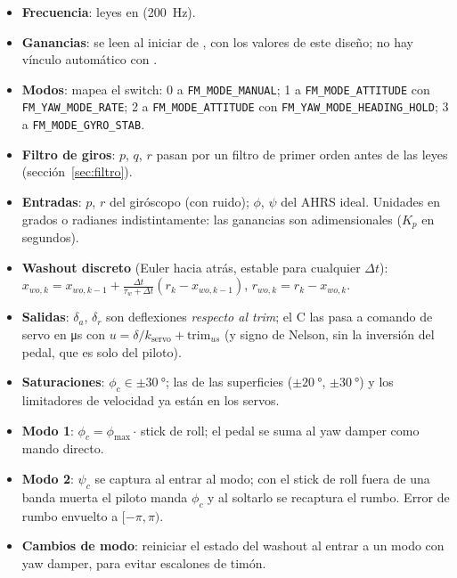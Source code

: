 \documentclass[11pt,a4paper]{article}
\begin{document}
\begin{itemize}
  \item \textbf{Frecuencia}: leyes en  (\SI{200}{Hz}).
  \item \textbf{Ganancias}: se leen al iniciar de
        , con los valores de este diseño; no hay
        vínculo automático con .
  \item \textbf{Modos}:  mapea el switch: 0 a
        \texttt{FM\_MODE\_MANUAL}; 1 a \texttt{FM\_MODE\_ATTITUDE} con
        \texttt{FM\_YAW\_MODE\_RATE}; 2 a \texttt{FM\_MODE\_ATTITUDE} con
        \texttt{FM\_YAW\_MODE\_HEADING\_HOLD}; 3 a
        \texttt{FM\_MODE\_GYRO\_STAB}.
  \item \textbf{Filtro de giros}: $p$, $q$, $r$ pasan por un filtro de primer
        orden antes de las leyes (sección~\ref{sec:filtro}).
  \item \textbf{Entradas}: $p$, $r$ del giróscopo (con ruido); $\phi$, $\psi$
        del AHRS ideal. Unidades en grados o radianes indistintamente: las
        ganancias son adimensionales ($K_p$ en segundos).
  \item \textbf{Washout discreto} (Euler hacia atrás, estable para cualquier
        $\Delta t$):
        $x_{wo,k} = x_{wo,k-1} + \frac{\Delta t}{\tau_w + \Delta t}(r_k - x_{wo,k-1})$,
        $r_{wo,k} = r_k - x_{wo,k}$.
  \item \textbf{Salidas}: $\delta_a$, $\delta_r$ son deflexiones
        \emph{respecto al trim}; el C las pasa a comando de servo en
        \si{\micro s} con $u = \delta/k_{\text{servo}} + \text{trim}_{us}$
        (y signo de Nelson, sin la inversión del pedal, que es solo del piloto).
  \item \textbf{Saturaciones}: $\phi_c \in \pm\SI{30}{\degree}$; las de
        las superficies ($\pm\SI{20}{\degree}$, $\pm\SI{30}{\degree}$) y los
        limitadores de velocidad ya están en los servos.
  \item \textbf{Modo 1}: $\phi_c = \phi_{\max}\cdot$\,stick de roll; el pedal se
        suma al yaw damper como mando directo.
  \item \textbf{Modo 2}: $\psi_c$ se captura al entrar al modo; con el stick
        de roll fuera de una banda muerta el piloto manda $\phi_c$ y al
        soltarlo se recaptura el rumbo. Error de rumbo envuelto a
        $[-\pi,\pi)$.
  \item \textbf{Cambios de modo}: reiniciar el estado del washout al entrar a
        un modo con yaw damper, para evitar escalones de timón.
\end{itemize}
\end{document}
